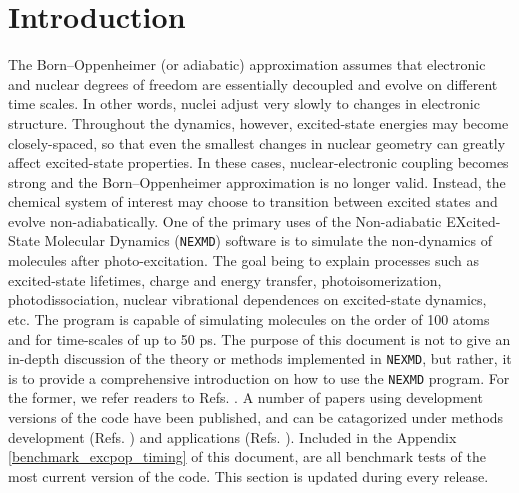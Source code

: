 \documentclass[letterpaper,12pt,titlepage]{article}
\begin{document}
\newpage
\section{Introduction}

The Born--Oppenheimer (or adiabatic) approximation assumes that electronic and nuclear degrees of freedom are essentially decoupled and evolve on different time scales.  In other words, nuclei adjust very slowly to changes in electronic structure.  Throughout the dynamics, however, excited-state energies may become closely-spaced, so that even the smallest changes in nuclear geometry can greatly affect excited-state properties.  In these cases, nuclear-electronic coupling becomes strong and the Born--Oppenheimer approximation is no longer valid.  Instead, the chemical system of interest may choose to transition between excited states and evolve non-adiabatically.  One of the primary uses of the Non-adiabatic EXcited-State Molecular Dynamics (\verb+NEXMD+) software is to simulate the non-dynamics of molecules after photo-excitation.  The goal being to explain processes such as excited-state lifetimes, charge and energy transfer, photoisomerization, photodissociation, nuclear vibrational dependences on excited-state dynamics, etc.  The program is capable of simulating molecules on the order of 100 atoms and for time-scales of up to 50 ps.  The purpose of this document is not to give an in-depth discussion of the theory or methods implemented in \verb+NEXMD+, but rather, it is to provide a comprehensive introduction on how to use the \verb+NEXMD+ program.  For the former, we refer readers to Refs. \cite{nelson2011nonadiabatic, nelson2014nonadiabatic}.  A number of papers using development versions of the code have been published, and can be catagorized under methods development (Refs. \cite{nelson2012nonadiabatic,fernandez2012identification,nelson2013nonadiabatic,
nelson2013artifacts,soler2014signature,bjorgaard2015solvent1,bjorgaard2015solvent2,nelson2016nonadiabatic,bjorgaard2016nonequilibrium}) and applications (Refs. \cite{fernandez2009nonadiabatic,fernandez2010unidirectional,soler2012analysis,fernandez2012shishiodoshi,nelson2013conformational,oldani2014modeling,
ondarse2014computational,galindo2015dynamics,bricker2015non,shenai2015internal,greenfield2015photoactive,alfonso2015photoexcited,bjorgaard2015simulations,
franklin2016carbon,ondarse2016ultrafast,nelson2016ultrafast,alfonso2016interference,nelson2017electronic,franklin2017phonon,zheng2017photoinduced}).  Included in the Appendix \ref{benchmark_excpop_timing} of this document, are all benchmark tests of the most current version of the code.  This section is updated during every release.
\end{document}

